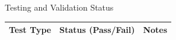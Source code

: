 \documentclass[12pt,a4paper]{article}
\newcommand{\sectiontitle}[1]{%
    {\color{GEUBlue}
    \fontsize{18}{22}\selectfont #1}
}
\begin{document}
\vspace{0.65cm}

\newpage


\vspace*{0.20cm}

\sectiontitle{Testing and Validation Status}

\vspace{0.30cm}

\begin{tabularx}{\textwidth}{
|>{\raggedright\arraybackslash}p{}
|>{\raggedright\arraybackslash}p{}
|>{\raggedright\arraybackslash}X|
}
\hline

\textbf{Test Type} &
\textbf{Status (Pass/Fail)} &
\textbf{Notes}
\\
\hline


\end{tabularx}
\end{document}
